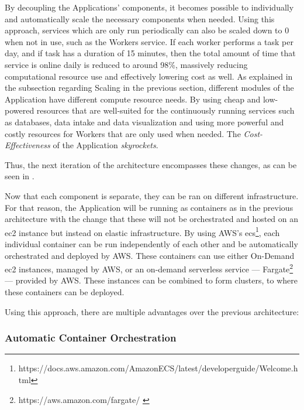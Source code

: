 By decoupling the Applications' components, it becomes possible to individually and automatically scale the necessary components when needed. Using this approach, services which are only run periodically can also be scaled down to 0 when not in use, such as the Workers service. If each worker performs a task per day, and if task has a duration of 15 minutes, then the total amount of time that service is online daily is reduced to around 98\%, massively reducing computational resource use and effectively lowering cost as well. As explained in the subsection regarding Scaling in the previous section, different modules of the Application have different compute resource needs. By using cheap and low-powered resources that are well-suited for the continuously running services such as databases, data intake and data visualization and using more powerful and costly resources for Workers that are only used when needed. The \textit{Cost-Effectiveness} of the Application \textit{skyrockets}.


 


Thus, the next iteration of the architecture encompasses these changes, as can be seen in .

Now that each component is separate, they can be ran on different infrastructure. For that reason, the Application will be running as containers as in the previous architecture with the change that these will not be orchestrated and hosted on an \gls{ec2} instance but instead on elastic infrastructure. By using AWS's \gls{ecs}\footnote{https://docs.aws.amazon.com/AmazonECS/latest/developerguide/Welcome.html\label{foot:aws-ecs}}, each individual container can be run independently of each other and be automatically orchestrated and deployed by AWS. These containers can use either On-Demand {ec2} instances, managed by AWS, or an on-demand serverless service --- Fargate\footnote{https://aws.amazon.com/fargate/ \label{foot:fargate}} --- provided by AWS. These instances can be combined to form clusters, to where these containers can be deployed. 

Using this approach, there are multiple advantages over the previous architecture:

\subsubsection{Automatic Container Orchestration}\label{methodology:sss:automatic-container-orchestration}

